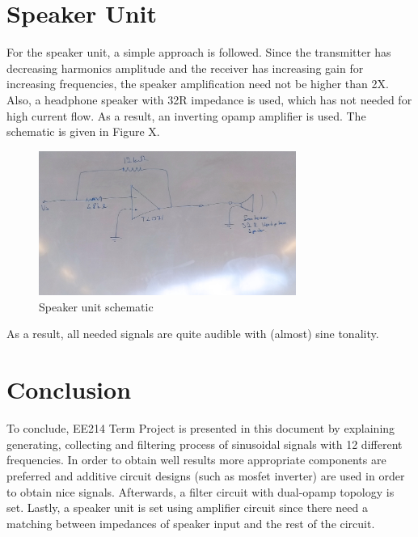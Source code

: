 \documentclass[letterpaper,12pt]{article}
\begin{document}
\section{Speaker Unit}
For the speaker unit, a simple approach is followed. Since the transmitter has decreasing harmonics amplitude and the receiver has increasing gain for increasing frequencies, the speaker amplification need not be higher than 2X. Also, a headphone speaker with 32R impedance is used, which has not needed for high current flow. As a result, an inverting opamp amplifier is used. The schematic is given in Figure X.
\begin{figure}[H]
    \centering
    \includegraphics[width = 0.75\textwidth]{speaker_schematic.jpg}
    \caption{Speaker unit schematic}
\end{figure}

As a result, all needed signals are quite audible with (almost) sine tonality. 

\section{Conclusion}
 To conclude, EE214 Term Project is presented in this document by explaining generating, collecting and filtering process of sinusoidal signals with 12 different frequencies. In order to obtain well results more appropriate components are preferred and additive circuit designs (such as mosfet inverter) are used in order to obtain nice signals. Afterwards, a filter circuit with dual-opamp topology is set. Lastly, a speaker unit is set using amplifier circuit since there need a matching between impedances of speaker input and the rest of the circuit.    
\end{document}

